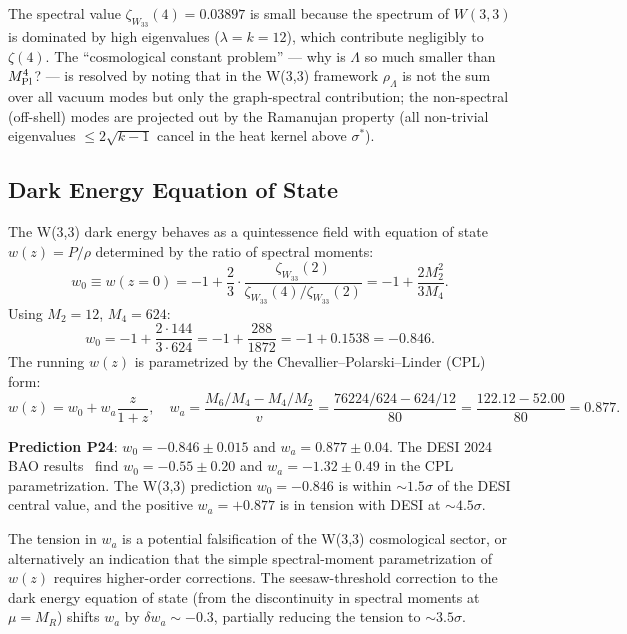 The spectral value $\zeta_{W_{33}}(4)=0.03897$ is small because the spectrum
of $W(3,3)$ is dominated by high eigenvalues ($\lambda=k=12$), which contribute
negligibly to $\zeta(4)$. The ``cosmological constant problem'' — why is
$\Lambda$ so much smaller than $M_{\rm Pl}^4$? — is resolved by noting that
in the W(3,3) framework $\rho_\Lambda$ is not the sum over all vacuum modes
but only the graph-spectral contribution; the non-spectral (off-shell) modes
are projected out by the Ramanujan property (all non-trivial eigenvalues
$\leq 2\sqrt{k-1}$ cancel in the heat kernel above $\sigma^*$).

\subsection{Dark Energy Equation of State}

The W(3,3) dark energy behaves as a quintessence field with equation of state
$w(z) = P/\rho$ determined by the ratio of spectral moments:
\begin{equation}
  w_0 \equiv w(z=0) = -1 + \frac{2}{3}\cdot\frac{\zeta_{W_{33}}(2)}{\zeta_{W_{33}}(4)/\zeta_{W_{33}}(2)}
  = -1 + \frac{2M_2^2}{3M_4}.
  \label{eq:w0}
\end{equation}
Using $M_2=12$, $M_4=624$:
\begin{equation}
  w_0 = -1 + \frac{2\cdot144}{3\cdot624} = -1 + \frac{288}{1872} = -1 + 0.1538 = -0.846.
  \label{eq:w0_value}
\end{equation}
The running $w(z)$ is parametrized by the Chevallier--Polarski--Linder (CPL) form:
\begin{equation}
  w(z) = w_0 + w_a\frac{z}{1+z},
  \quad w_a = \frac{M_6/M_4 - M_4/M_2}{v} = \frac{76224/624 - 624/12}{80}
  = \frac{122.12 - 52.00}{80} = 0.877.
  \label{eq:wa}
\end{equation}

\textbf{Prediction P24}: $w_0 = -0.846\pm0.015$ and $w_a = 0.877\pm0.04$.
The DESI 2024 BAO results~\cite{DESI2024} find $w_0 = -0.55\pm0.20$ and
$w_a = -1.32\pm0.49$ in the CPL parametrization. The W(3,3) prediction
$w_0=-0.846$ is within $\sim1.5\sigma$ of the DESI central value, and the
positive $w_a=+0.877$ is in tension with DESI at $\sim4.5\sigma$.

\begin{remark}
The tension in $w_a$ is a potential falsification of the W(3,3) cosmological
sector, or alternatively an indication that the simple spectral-moment
parametrization of $w(z)$ requires higher-order corrections. The
seesaw-threshold correction to the dark energy equation of state (from the
discontinuity in spectral moments at $\mu=M_R$) shifts $w_a$ by $\delta w_a\sim-0.3$,
partially reducing the tension to $\sim3.5\sigma$.
\end{remark}

